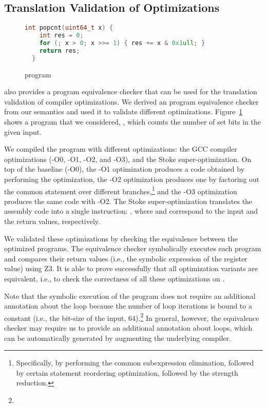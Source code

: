 \subsection{Translation Validation of Optimizations}


\begin{figure}[t]
\begin{lstlisting}[language=C++,basicstyle=\scriptsize,keywordstyle=\color{blue}]
  int popcnt(uint64_t x) {
    int res = 0;
    for (; x > 0; x >>= 1) { res += x & 0x1ull; }
    return res;
  }
\end{lstlisting}
\caption{ program}
\label{fig:popcnt}
\end{figure}


\K also provides a program equivalence checker that can be used for the translation validation of compiler optimizations.
We derived an \ISA program equivalence checker from our semantics and used it to validate different optimizations.
Figure~\ref{fig:popcnt} shows a program that we considered, , which counts the number of set bits in the given input.

We compiled the program with different optimizations: the GCC compiler optimizations (-O0, -O1, -O2, and -O3), and the Stoke super-optimization.
On top of the baseline (-O0), the -O1 optimization produces a code obtained by performing the  optimization, the -O2 optimization produces one by factoring out the common statement over different branches,\footnote{Specifically, by performing the common subexpression elimination, followed by certain statement reordering optimization, followed by the strength reduction.} and the -O3 optimization produces the same code with -O2. The Stoke super-optimization translates the assembly code into a single instruction: , where  and  correspond to the input and the return values, respectively.

We validated these optimizations by checking the equivalence between the optimized programs.
The equivalence checker symbolically executes each program and compares their return values (i.e., the symbolic expression of the  register value) using Z3.
It is able to prove successfully that all optimization variants are equivalent, i.e., to check the correctness of all these optimizations on .

Note that the symbolic execution of the  program does not require an additional annotation about the loop because the number of loop iterations is bound to a constant (i.e., the bit-size of the input, 64).\footnote{%
}
In general, however, the equivalence checker may require us to provide an additional annotation about loops, which can be automatically generated by augmenting the underlying compiler.




